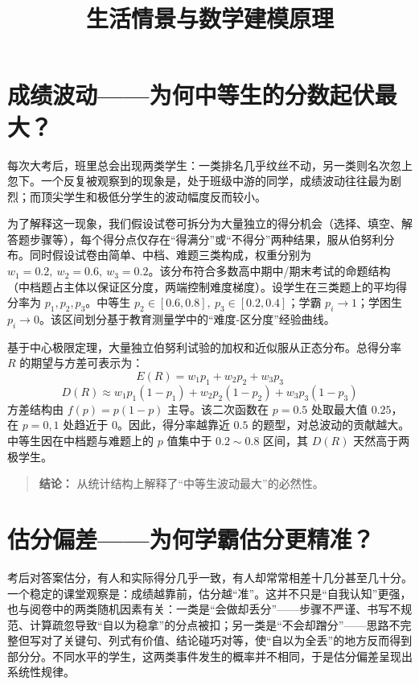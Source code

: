 \documentclass[10pt]{article}
\title{生活情景与数学建模原理}
\author{}
\date{}
\begin{document}
\maketitle

\section{成绩波动——为何中等生的分数起伏最大？}

每次大考后，班里总会出现两类学生：一类排名几乎纹丝不动，另一类则名次忽上忽下。一个反复被观察到的现象是，处于班级中游的同学，成绩波动往往最为剧烈；而顶尖学生和极低分学生的波动幅度反而较小。

为了解释这一现象，我们假设试卷可拆分为大量独立的得分机会（选择、填空、解答题步骤等），每个得分点仅存在“得满分”或“不得分”两种结果，服从伯努利分布。同时假设试卷由简单、中档、难题三类构成，权重分别为 $w_1=0.2,\ w_2=0.6,\ w_3=0.2$。该分布符合多数高中期中/期末考试的命题结构（中档题占主体以保证区分度，两端控制难度梯度）。设学生在三类题上的平均得分率为 $p_1,p_2,p_3$。中等生 $p_2\in[0.6,0.8],\ p_3\in[0.2,0.4]$；学霸 $p_i\to 1$；学困生 $p_i\to 0$。该区间划分基于教育测量学中的“难度-区分度”经验曲线。

基于中心极限定理，大量独立伯努利试验的加权和近似服从正态分布。总得分率 $R$ 的期望与方差可表示为：
$$
E(R) = w_1 p_1 + w_2 p_2 + w_3 p_3
$$
$$
D(R) \approx w_1 p_1(1-p_1) + w_2 p_2(1-p_2) + w_3 p_3(1-p_3)
$$
方差结构由 $f(p)=p(1-p)$ 主导。该二次函数在 $p=0.5$ 处取最大值 $0.25$，在 $p=0,1$ 处趋近于 $0$。因此，得分率越靠近 $0.5$ 的题型，对总波动的贡献越大。中等生因在中档题与难题上的 $p$ 值集中于 $0.2\sim0.8$ 区间，其 $D(R)$ 天然高于两极学生。

\begin{quote}
\textbf{结论：} 从统计结构上解释了“中等生波动最大”的必然性。
\end{quote}

\section{估分偏差——为何学霸估分更精准？}

考后对答案估分，有人和实际得分几乎一致，有人却常常相差十几分甚至几十分。一个稳定的课堂观察是：成绩越靠前，估分越“准”。这并不只是“自我认知”更强，也与阅卷中的两类随机因素有关：一类是“会做却丢分”——步骤不严谨、书写不规范、计算疏忽导致“自以为稳拿”的分点被扣；另一类是“不会却蹭分”——思路不完整但写对了关键句、列式有价值、结论碰巧对等，使“自以为全丢”的地方反而得到部分分。不同水平的学生，这两类事件发生的概率并不相同，于是估分偏差呈现出系统性规律。
\end{document}
